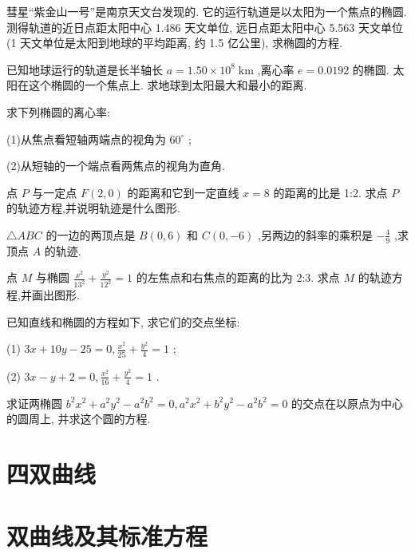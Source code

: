 \documentclass[lang=cn,newtx,10.5pt,scheme=chinese]{elegantbook}
\begin{document}
\begin{problemset}[习 题 六]
\item 彗星“紫金山一号”是南京天文台发现的. 它的运行轨道是以太阳为一个焦点的椭圆. 测得轨道的近日点距太阳中心 1.486 天文单位, 远日点距太阳中心 5.563 天文单位 (1 天文单位是太阳到地球的平均距离, 约 1.5 亿公里), 求椭圆的方程.

\item 已知地球运行的轨道是长半轴长 \(a = {1.50} \times {10}^{8}\mathrm{\;{km}}\) ,离心率 \(e = {0.0192}\) 的椭圆. 太阳在这个椭圆的一个焦点上. 求地球到太阳最大和最小的距离.

\item 求下列椭圆的离心率:

(1)从焦点看短轴两端点的视角为 \({60}^{ \circ }\) ;

(2)从短轴的一个端点看两焦点的视角为直角.

\item 点 \(P\) 与一定点 \(F\left( {2,0}\right)\) 的距离和它到一定直线 \(x = 8\) 的距离的比是 1:2. 求点 \(P\) 的轨迹方程,并说明轨迹是什么图形.

\item \(\bigtriangleup {ABC}\) 的一边的两顶点是 \(B\left( {0,6}\right)\) 和 \(C\left( {0, - 6}\right)\) ,另两边的斜率的乘积是 \(- \frac{4}{9}\) ,求顶点 \(A\) 的轨迹.

\item 点 \(M\) 与椭圆 \(\frac{{x}^{2}}{{13}^{2}} + \frac{{y}^{2}}{{12}^{2}} = 1\) 的左焦点和右焦点的距离的比为 2:3. 求点 \(M\) 的轨迹方程,并画出图形.

\item 已知直线和椭圆的方程如下, 求它们的交点坐标:

(1) \({3x} + {10y} - {25} = 0,\frac{{x}^{2}}{25} + \frac{{y}^{2}}{4} = 1\) ;

(2) \({3x} - y + 2 = 0,\frac{{x}^{2}}{16} + \frac{{y}^{2}}{4} = 1\) .

\item 求证两椭圆 \({b}^{2}{x}^{2} + {a}^{2}{y}^{2} - {a}^{2}{b}^{2} = 0,{a}^{2}{x}^{2} + {b}^{2}{y}^{2} - {a}^{2}{b}^{2} = 0\) 的交点在以原点为中心的圆周上, 并求这个圆的方程.

\end{problemset}

\section*{四\text{ }双曲线}

\section{双曲线及其标准方程}
\end{document}
